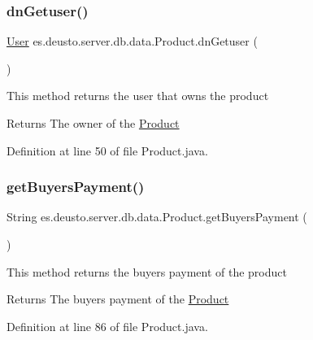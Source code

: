 \subsubsection{\texorpdfstring{dn\+Getuser()}{dnGetuser()}}
{\footnotesize\ttfamily \hyperlink{classes_1_1deusto_1_1server_1_1db_1_1data_1_1_user}{User} es.\+deusto.\+server.\+db.\+data.\+Product.\+dn\+Getuser (\begin{DoxyParamCaption}{ }\end{DoxyParamCaption})}

This method returns the user that owns the product \begin{DoxyReturn}{Returns}
The owner of the \hyperlink{classes_1_1deusto_1_1server_1_1db_1_1data_1_1_product}{Product} 
\end{DoxyReturn}


Definition at line 50 of file Product.\+java.

\mbox{\label{classes_1_1deusto_1_1server_1_1db_1_1data_1_1_product_a486ece3e8cc4e08b086239c0ea11b492}} 
\subsubsection{\texorpdfstring{get\+Buyers\+Payment()}{getBuyersPayment()}}
{\footnotesize\ttfamily String es.\+deusto.\+server.\+db.\+data.\+Product.\+get\+Buyers\+Payment (\begin{DoxyParamCaption}{ }\end{DoxyParamCaption})}

This method returns the buyers payment of the product \begin{DoxyReturn}{Returns}
The buyers payment of the \hyperlink{classes_1_1deusto_1_1server_1_1db_1_1data_1_1_product}{Product} 
\end{DoxyReturn}


Definition at line 86 of file Product.\+java.

\mbox{\label{classes_1_1deusto_1_1server_1_1db_1_1data_1_1_product_ab352b5efab8c748a45e8d28b9fad2411}} 
